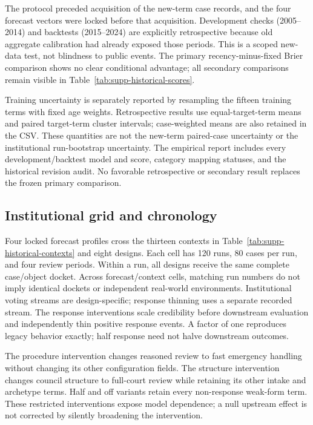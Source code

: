 \documentclass[
  journal=small,
  manuscript=research-article,
  year=2026
]{cup-journal}
\begin{document}
The protocol preceded acquisition of the new-term case records, and the four forecast vectors were locked before that acquisition. Development checks (2005--2014) and backtests (2015--2024) are explicitly retrospective because old aggregate calibration had already exposed those periods. This is a scoped new-data test, not blindness to public events. The primary recency-minus-fixed Brier comparison shows no clear conditional advantage; all secondary comparisons remain visible in Table~\ref{tab:supp-historical-scores}.





Training uncertainty is separately reported by resampling the fifteen training terms with fixed age weights. Retrospective results use equal-target-term means and paired target-term cluster intervals; case-weighted means are also retained in the CSV. These quantities are not the new-term paired-case uncertainty or the institutional run-bootstrap uncertainty. The empirical report includes every development/backtest model and score, category mapping statuses, and the historical revision audit. No favorable retrospective or secondary result replaces the frozen primary comparison.

\subsection*{Institutional grid and chronology}

Four locked forecast profiles cross the thirteen contexts in Table~\ref{tab:supp-historical-contexts} and eight designs. Each cell has 120 runs, 80 cases per run, and four review periods. Within a run, all designs receive the same complete case/object docket. Across forecast/context cells, matching run numbers do not imply identical dockets or independent real-world environments. Institutional voting streams are design-specific; response thinning uses a separate recorded stream. The response interventions scale credibility before downstream evaluation and independently thin positive response events. A factor of one reproduces legacy behavior exactly; half response need not halve downstream outcomes.

The procedure intervention changes reasoned review to fast emergency handling without changing its other configuration fields. The structure intervention changes council structure to full-court review while retaining its other intake and archetype terms. Half and off variants retain every non-response weak-form term. These restricted interventions expose model dependence; a null upstream effect is not corrected by silently broadening the intervention.
\end{document}

